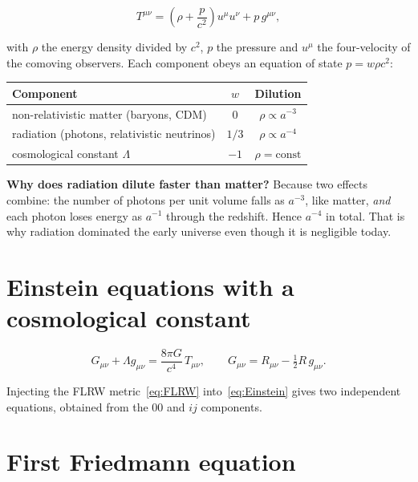 \documentclass[11pt,a4paper,openany]{report}
\begin{document}
\begin{equation}
T^{\mu\nu} = \left(\rho + \frac{p}{c^{2}}\right)u^{\mu}u^{\nu} + p\,g^{\mu\nu},
\label{eq:Tmunu}
\end{equation}

\noindent with $\rho$ the energy density divided by $c^2$, $p$ the pressure and
$u^{\mu}$ the four-velocity of the comoving observers. Each component obeys an
equation of state $p = w\rho c^{2}$:

\begin{center}
\renewcommand{\arraystretch}{1.25}
\begin{tabular}{lcc}
\toprule
\textbf{Component} & $w$ & \textbf{Dilution} \\
\midrule
non-relativistic matter (baryons, CDM) & $0$ & $\rho \propto a^{-3}$ \\
radiation (photons, relativistic neutrinos) & $1/3$ & $\rho \propto a^{-4}$ \\
cosmological constant $\Lambda$ & $-1$ & $\rho = \text{const}$ \\
\bottomrule
\end{tabular}
\end{center}

\begin{tcolorbox}[plain]
\textbf{Why does radiation dilute faster than matter?} Because two effects
combine: the number of photons per unit volume falls as $a^{-3}$, like matter,
\emph{and} each photon loses energy as $a^{-1}$ through the redshift. Hence
$a^{-4}$ in total. That is why radiation dominated the early universe even
though it is negligible today.
\end{tcolorbox}

\section{Einstein equations with a cosmological constant}

\begin{equation}
G_{\mu\nu} + \Lambda g_{\mu\nu} = \frac{8\pi G}{c^{4}}\,T_{\mu\nu},
\qquad G_{\mu\nu} = R_{\mu\nu} - \tfrac{1}{2}R\,g_{\mu\nu}.
\label{eq:Einstein}
\end{equation}

Injecting the FLRW metric~\eqref{eq:FLRW} into~\eqref{eq:Einstein} gives two
independent equations, obtained from the $00$ and $ij$ components.

\section{First Friedmann equation}
\end{document}
